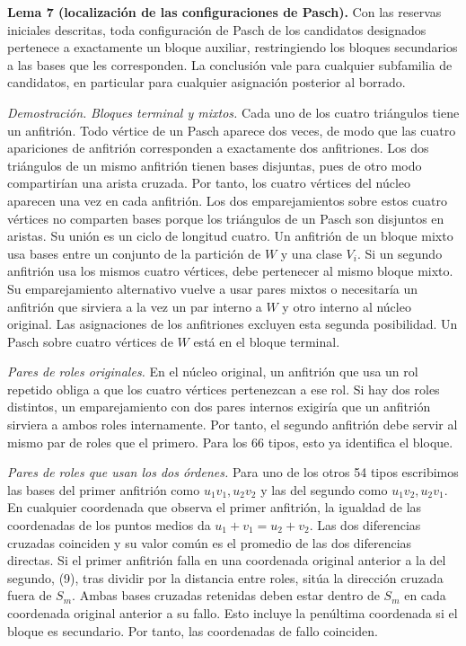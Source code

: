 \documentclass[spanish,11pt,a4paper]{article}
\begin{document}
\textbf{Lema 7 (localización de las configuraciones de Pasch).} Con las reservas iniciales descritas, toda configuración de Pasch de los candidatos designados pertenece a exactamente un bloque auxiliar, restringiendo los bloques secundarios a las bases que les corresponden. La conclusión vale para cualquier subfamilia de candidatos, en particular para cualquier asignación posterior al borrado.

\emph{Demostración.} \emph{Bloques terminal y mixtos.} Cada uno de los cuatro triángulos tiene un anfitrión. Todo vértice de un Pasch aparece dos veces, de modo que las cuatro apariciones de anfitrión corresponden a exactamente dos anfitriones. Los dos triángulos de un mismo anfitrión tienen bases disjuntas, pues de otro modo compartirían una arista cruzada. Por tanto, los cuatro vértices del núcleo aparecen una vez en cada anfitrión. Los dos emparejamientos sobre estos cuatro vértices no comparten bases porque los triángulos de un Pasch son disjuntos en aristas. Su unión es un ciclo de longitud cuatro. Un anfitrión de un bloque mixto usa bases entre un conjunto de la partición de \(W\) y una clase \(V_i\). Si un segundo anfitrión usa los mismos cuatro vértices, debe pertenecer al mismo bloque mixto. Su emparejamiento alternativo vuelve a usar pares mixtos o necesitaría un anfitrión que sirviera a la vez un par interno a \(W\) y otro interno al núcleo original. Las asignaciones de los anfitriones excluyen esta segunda posibilidad. Un Pasch sobre cuatro vértices de \(W\) está en el bloque terminal.

\emph{Pares de roles originales.} En el núcleo original, un anfitrión que usa un rol repetido obliga a que los cuatro vértices pertenezcan a ese rol. Si hay dos roles distintos, un emparejamiento con dos pares internos exigiría que un anfitrión sirviera a ambos roles internamente. Por tanto, el segundo anfitrión debe servir al mismo par de roles que el primero. Para los 66 tipos, esto ya identifica el bloque.

\emph{Pares de roles que usan los dos órdenes.} Para uno de los otros 54 tipos escribimos las bases del primer anfitrión como \(u_1v_1,u_2v_2\) y las del segundo como \(u_1v_2,u_2v_1\). En cualquier coordenada que observa el primer anfitrión, la igualdad de las coordenadas de los puntos medios da \(u_1+v_1=u_2+v_2\). Las dos diferencias cruzadas coinciden y su valor común es el promedio de las dos diferencias directas. Si el primer anfitrión falla en una coordenada original anterior a la del segundo, (9), tras dividir por la distancia entre roles, sitúa la dirección cruzada fuera de \(S_m\). Ambas bases cruzadas retenidas deben estar dentro de \(S_m\) en cada coordenada original anterior a su fallo. Esto incluye la penúltima coordenada si el bloque es secundario. Por tanto, las coordenadas de fallo coinciden.
\end{document}
